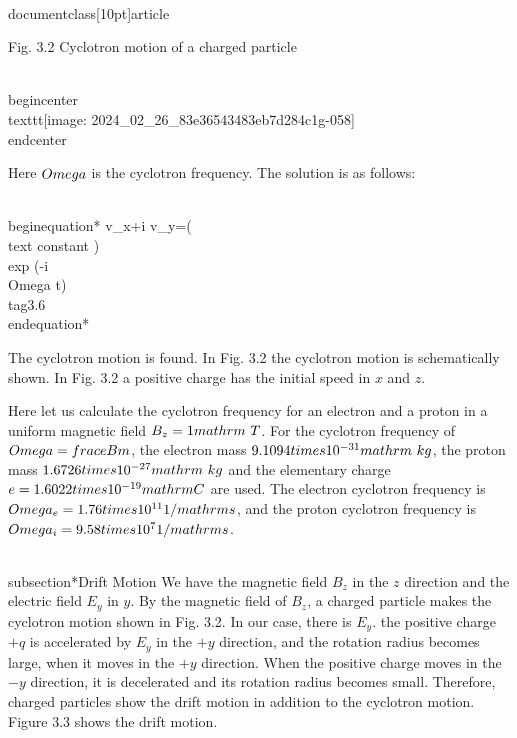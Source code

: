 \\documentclass[10pt]{article}
\begin{document}
Fig. 3.2 Cyclotron motion of a charged particle

\\begin{center}
\\texttt{[image: 2024\_02\_26\_83e36543483eb7d284c1g-058]}
\\end{center}

Here $\\Omega$ is the cyclotron frequency. The solution is as follows:


\\begin{equation*}
v_{x}+i v_{y}=(\\text { constant }) \\exp (-i \\Omega t) \\tag{3.6}
\\end{equation*}


The cyclotron motion is found. In Fig. 3.2 the cyclotron motion is schematically shown. In Fig. 3.2 a positive charge has the initial speed in $x$ and $z$.

Here let us calculate the cyclotron frequency for an electron and a proton in a uniform magnetic field $B_{z}=1 \\mathrm{~T}$. For the cyclotron frequency of $\\Omega=\\frac{e B}{m}$, the electron mass $9.1094 \\times 10^{-31} \\mathrm{~kg}$, the proton mass $1.6726 \\times 10^{-27} \\mathrm{~kg}$ and the elementary charge $e=1.6022 \\times 10^{-19} \\mathrm{C}$ are used. The electron cyclotron frequency is $\\Omega_{e}=1.76 \\times 10^{11} 1 / \\mathrm{s}$, and the proton cyclotron frequency is $\\Omega_{i}=9.58 \\times 10^{7} 1 / \\mathrm{s}$.

\\subsection*{Drift Motion}
We have the magnetic field $B_{z}$ in the $z$ direction and the electric field $E_{y}$ in $y$. By the magnetic field of $B_{z}$, a charged particle makes the cyclotron motion shown in Fig. 3.2. In our case, there is $E_{y}$. the positive charge $+q$ is accelerated by $E_{y}$ in the $+y$ direction, and the rotation radius becomes large, when it moves in the $+y$ direction. When the positive charge moves in the $-y$ direction, it is decelerated and its rotation radius becomes small. Therefore, charged particles show the drift motion in addition to the cyclotron motion. Figure 3.3 shows the drift motion.
\end{document}
